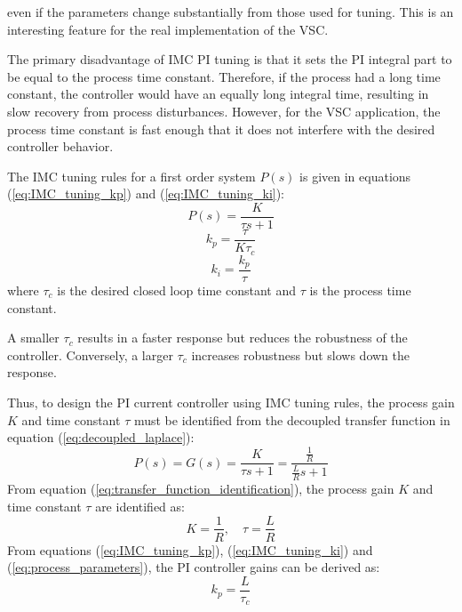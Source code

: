 even if the parameters change substantially from those used for tuning. This is an interesting feature for the real
implementation of the VSC.\par
The primary disadvantage of IMC PI tuning is that it sets the PI integral part to be equal to
the process time constant. Therefore, if the process had a long time constant, the controller
would have an equally long integral time, resulting in slow recovery from process disturbances.
However, for the VSC application, the process time constant is fast enough that it does not
interfere with the desired controller behavior.\par
The IMC tuning rules for a first order system $P(s)$ is given in equations (\ref{eq:IMC_tuning_kp}) and (\ref{eq:IMC_tuning_ki}):
\begin{equation}
    P(s) = \frac{K}{\tau s + 1}
    \label{eq:first_order_system}
\end{equation}
\begin{equation}
    k_{p} = \frac{\tau}{K \tau_c}
    \label{eq:IMC_tuning_kp}
\end{equation}
\begin{equation}
    k_{i} = \frac{k_p}{\tau}
    \label{eq:IMC_tuning_ki}
\end{equation}
where $\tau_c$ is the desired closed loop time constant and $\tau$ is the process time constant.\par
A smaller $\tau_c$ results in a faster response but reduces the robustness of the controller.
Conversely, a larger $\tau_c$ increases robustness but slows down the response.\par
Thus, to design the PI current controller using IMC tuning rules, the process gain $K$ and time constant $\tau$
must be identified from the decoupled transfer function in equation (\ref{eq:decoupled_laplace}):
\begin{equation}
    P(s) = G(s) = \frac{K}{\tau s + 1}= \frac{\frac{1}{R}}{\frac{L}{R}s + 1}
    \label{eq:transfer_function_identification}
\end{equation}
From equation (\ref{eq:transfer_function_identification}), the process gain $K$ and time constant $\tau$ are identified as:
\begin{equation}
    K = \frac{1}{R}, \quad \tau = \frac{L}{R}
    \label{eq:process_parameters}
\end{equation}
From equations (\ref{eq:IMC_tuning_kp}), (\ref{eq:IMC_tuning_ki}) and (\ref{eq:process_parameters}), the PI controller gains
can be derived as:
\begin{equation}
    k_{p} = \frac{L}{\tau_c}
    \label{eq:final_kp}
\end{equation}
